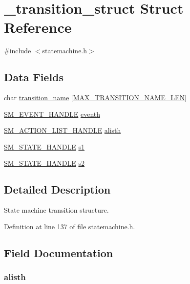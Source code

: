 \hypertarget{struct__transition__struct}{\section{\-\_\-transition\-\_\-struct Struct Reference}
\label{struct__transition__struct}
}


{\ttfamily \#include $<$statemachine.\-h$>$}

\subsection*{Data Fields}
\begin{DoxyCompactItemize}
\item 
char \hyperlink{struct__transition__struct_a63280c8292749ceea0f462abeae944f5}{transition\-\_\-name} \mbox{[}\hyperlink{statemachine_8h_a7e57d2821960341f4eba42256a1f5417}{M\-A\-X\-\_\-\-T\-R\-A\-N\-S\-I\-T\-I\-O\-N\-\_\-\-N\-A\-M\-E\-\_\-\-L\-E\-N}\mbox{]}
\item 
\hyperlink{statemachine_8h_acb17336d3c3a21ee8233cec54bb55b4f}{S\-M\-\_\-\-E\-V\-E\-N\-T\-\_\-\-H\-A\-N\-D\-L\-E} \hyperlink{struct__transition__struct_a59bd332d34b2d67050865ea52c88bc47}{eventh}
\item 
\hyperlink{statemachine_8h_a6f0ccd0b6cfa6e37d337d865442ee93b}{S\-M\-\_\-\-A\-C\-T\-I\-O\-N\-\_\-\-L\-I\-S\-T\-\_\-\-H\-A\-N\-D\-L\-E} \hyperlink{struct__transition__struct_a701b0b2f1cfb27963abc28ff5f05498b}{alisth}
\item 
\hyperlink{statemachine_8h_aa30fadf137d8a09eceea2a2d973be5ef}{S\-M\-\_\-\-S\-T\-A\-T\-E\-\_\-\-H\-A\-N\-D\-L\-E} \hyperlink{struct__transition__struct_a1350baa2c5b7f8e15d952e58a6bab9db}{s1}
\item 
\hyperlink{statemachine_8h_aa30fadf137d8a09eceea2a2d973be5ef}{S\-M\-\_\-\-S\-T\-A\-T\-E\-\_\-\-H\-A\-N\-D\-L\-E} \hyperlink{struct__transition__struct_a297f0deedc2f4794485a7367685a4ade}{s2}
\end{DoxyCompactItemize}


\subsection{Detailed Description}
State machine transition structure. 

Definition at line 137 of file statemachine.\-h.



\subsection{Field Documentation}
\hypertarget{struct__transition__struct_a701b0b2f1cfb27963abc28ff5f05498b}{
\subsubsection[{alisth}]{ alisth}}\label{struct__transition__struct_a701b0b2f1cfb27963abc28ff5f05498b}


